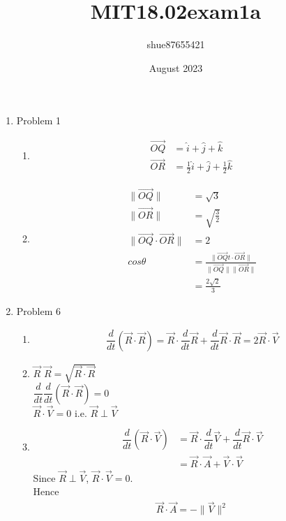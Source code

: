 \documentclass{article}
\title{MIT18.02exam1a}
\author{shue87655421 }
\date{August 2023}
\begin{document}
\maketitle

\begin{enumerate}
\item Problem 1

\begin{enumerate}
    \item 
    \begin{align}
        \vec{OQ}&=\widehat{i}+\widehat{j}+\widehat{k}\\
        \vec{OR}&=\frac{1}{2}\widehat{i}+\widehat{j}+\frac{1}{2}\widehat{k}\
    \end{align}
    
    \item
    \begin{align*}
        \| \vec{OQ}\| &=\sqrt{3}\\
        \| \vec{OR}\| &=\sqrt{\frac{3}{2}}\\
        \|\vec{OQ} \cdot \vec{OR}\| &= 2\\
        cos\theta &= \frac{\|\vec{OQ}t \cdot \vec{OR}\|}{\| \vec{OQ}\| \| \vec{OR}\|}\\
        &= \frac{2\sqrt{2}}{3}
    \end{align*}
\end{enumerate}

\item Problem 6
    \begin{enumerate}
    \item 
    \begin{align*}
        \dfrac{d}{dt}\left( \vec{R}\cdot \vec{R}\right) =\vec{R}\cdot \dfrac{d}{dt}\vec{R}+\dfrac{d}{dt}\vec{R}\cdot \vec{R} = 2\vec{R}\cdot \vec{V}
    \end{align*}
    \item 
    
         $\vec{R}$  $\vec{R} = \sqrt{\Vec{R}\cdot \Vec{R}}$\\
        \text{, hence } $\dfrac{d}{dt}\dfrac{d}{dt}\left( \vec{R}\cdot \vec{R}\right) = 0$\\
        \text{So }$\vec{R}\cdot \vec{V} = 0 \text{ i.e. } \Vec{R} \perp \Vec{V}$
    \item 
    \begin{align*}
        \dfrac{d}{dt}\left( \vec{R}\cdot \vec{V}\right) &=\vec{R}\cdot \dfrac{d}{dt}\vec{V}+\dfrac{d}{dt}\vec{R}\cdot \vec{V}\\
        &=\vec{R}\cdot \Vec{A} + \vec{V}\cdot \Vec{V}
    \end{align*}
    Since $\Vec{R} \perp \Vec{V}$, $\vec{R}\cdot \vec{V} = 0$.\\
    Hence
    \begin{align*}
        \vec{R}\cdot \Vec{A} = -\|\Vec{V}\|^2
    \end{align*}
    \end{enumerate}


\end{enumerate}
\end{document}
